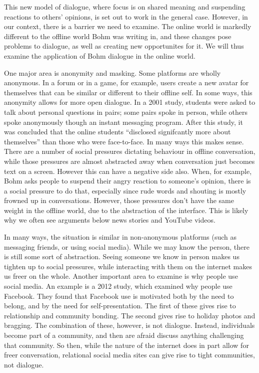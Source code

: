 \documentclass[]{article}
\begin{document}
This new model of dialogue, where focus is on shared meaning and
suspending reactions to others' opinions, is set out to work in the
general case. However, in our context, there is a barrier we need to
examine. The online world is markedly different to the offline world
Bohm was writing in, and these changes pose problems to dialogue, as
well as creating new opportunites for it. We will thus examine the
application of Bohm dialogue in the online world.

One major area is anonymity and masking. Some platforms are wholly
anonymous. In a forum or in a game, for example, users create a new
avatar for themselves that can be similar or different to their offline
self. In some ways, this anonymity allows for more open dialogue. In a
2001
study\autocite{JoinsonSelfdisclosurecomputermediatedcommunication2001},
students were asked to talk about personal questions in pairs; some
pairs spoke in person, while others spoke anonymously though an instant
messaging program. After this study, it was concluded that the online
students ``disclosed signifcantly more about
themselves''\autocite[pg 181]{JoinsonSelfdisclosurecomputermediatedcommunication2001}
than those who were face-to-face. In many ways this makes sense. There
are a number of social pressures dictating behaviour in offline
conversation, while those pressures are almost abstracted away when
conversation just becomes text on a screen. However this can have a
negative side also. When, for example, Bohm asks people to suspend their
angry reaction to someone's opinion, there is a social pressure to do
that, especially since rude words and shouting is mostly frowned up in
conversations. However, those pressures don't have the same weight in
the offline world, due to the abstraction of the interface. This is
likely why we often see arguments below news stories and YouTube videos.

In many ways, the situation is similar in non-anonymous platforms (such
as messaging friends, or using social media). While we may know the
person, there is still some sort of abstraction. Seeing someone we know
in person makes us tighten up to social pressures, while interacting
with them on the internet makes us freer on the whole. Another important
area to examine is why people use social media. An example is a 2012
study, which examined why people use
Facebook\autocite{NadkarniWhypeopleuse2012}. They found that Facebook
use is motivated both by the need to belong, and by the need for
self-presentation. The first of these gives rise to relationship and
community bonding. The second gives rise to holiday photos and bragging.
The combination of these, however, is not dialogue. Instead, individuals
become part of a community, and then are afraid discuss anything
challenging that community. So then, while the nature of the internet
does in part allow for freer conversation, relational social media sites
can give rise to tight communities, not dialogue.
\end{document}
